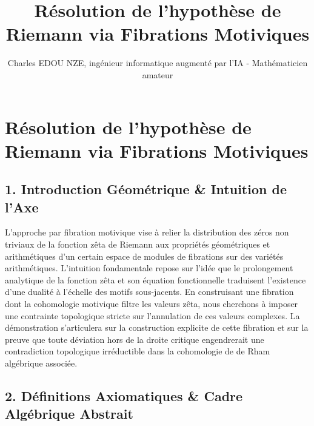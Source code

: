 \documentclass[
]{article}
\title{Résolution de l'hypothèse de Riemann via Fibrations Motiviques}
\author{Charles EDOU NZE, ingénieur informatique augmenté par l'IA - Mathématicien amateur}
\date{}
\begin{document}
\maketitle

\hypertarget{ruxe9solution-de-lhypothuxe8se-de-riemann-via-fibrations-motiviques}{%
\section{Résolution de l'hypothèse de Riemann via Fibrations
Motiviques}\label{ruxe9solution-de-lhypothuxe8se-de-riemann-via-fibrations-motiviques}}

\hypertarget{introduction-guxe9omuxe9trique-intuition-de-laxe}{%
\subsection{1. Introduction Géométrique \& Intuition de
l'Axe}\label{introduction-guxe9omuxe9trique-intuition-de-laxe}}

L'approche par fibration motivique vise à relier la distribution des
zéros non triviaux de la fonction zêta de Riemann aux propriétés
géométriques et arithmétiques d'un certain espace de modules de
fibrations sur des variétés arithmétiques. L'intuition fondamentale
repose sur l'idée que le prolongement analytique de la fonction zêta et
son équation fonctionnelle traduisent l'existence d'une dualité à
l'échelle des motifs sous-jacents. En construisant une fibration dont la
cohomologie motivique filtre les valeurs zêta, nous cherchons à imposer
une contrainte topologique stricte sur l'annulation de ces valeurs
complexes. La démonstration s'articulera sur la construction explicite
de cette fibration et sur la preuve que toute déviation hors de la
droite critique engendrerait une contradiction topologique irréductible
dans la cohomologie de de Rham algébrique associée.

\hypertarget{duxe9finitions-axiomatiques-cadre-alguxe9brique-abstrait}{%
\subsection{2. Définitions Axiomatiques \& Cadre Algébrique
Abstrait}\label{duxe9finitions-axiomatiques-cadre-alguxe9brique-abstrait}}
\end{document}
